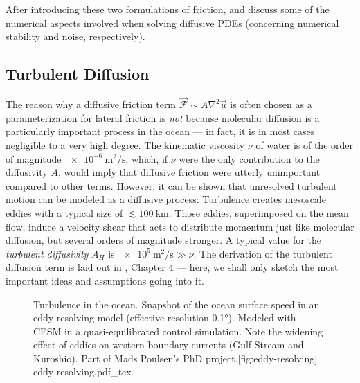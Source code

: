 After introducing these two formulations of friction,  and  discuss some of the numerical aspects involved when solving diffusive \acp{PDE} (concerning numerical stability and noise, respectively).

\subsection{Turbulent Diffusion}
\label{sec:friction-diff}
The %
%
reason why a diffusive friction term \(\vec{\mathcal{F}} \sim A \nabla^2 \vec{u}\) is often chosen as a parameterization for lateral friction is \emph{not} because molecular diffusion is a particularly important process in the ocean --- in fact, it is in most cases negligible to a very high degree. The kinematic viscosity \(\nu\) of water is of the order of magnitude \(\SI{e-6}{\metre\squared\per\second}\), which, if \(\nu\) were the only contribution to the diffusivity \(A\), would imply that diffusive friction were utterly unimportant compared to other terms. However, it can be shown that unresolved turbulent motion can be modeled as a diffusive process: Turbulence creates mesoscale eddies with a typical size of \(\lesssim \SI{100}{\kilo\metre}\). Those eddies, superimposed on the mean flow, induce a velocity shear that acts to distribute momentum just like molecular diffusion, but several orders of magnitude stronger. A typical value for the \emph{turbulent diffusivity} \(A_H\) is \(\SI{e5}{\metre\squared\per\second} \gg \nu\). The derivation of the turbulent diffusion term is laid out in , Chapter 4 --- here, we shall only sketch the most important ideas and assumptions going into it.
%
\begin{figure}
	\begin{sidecaption}{Turbulence in the ocean. Snapshot of the ocean surface speed in an eddy-resolving model (effective resolution \ang{0.1}). Modeled with \ac{CESM} in a quasi-equilibrated control simulation. Note the widening effect of eddies on western boundary currents (\eg Gulf Stream and Kuroshio). Part of Mads Poulsen's PhD project.}[fig:eddy-resolving]
		{eddy-resolving.pdf_tex}
	\end{sidecaption}
\end{figure}

